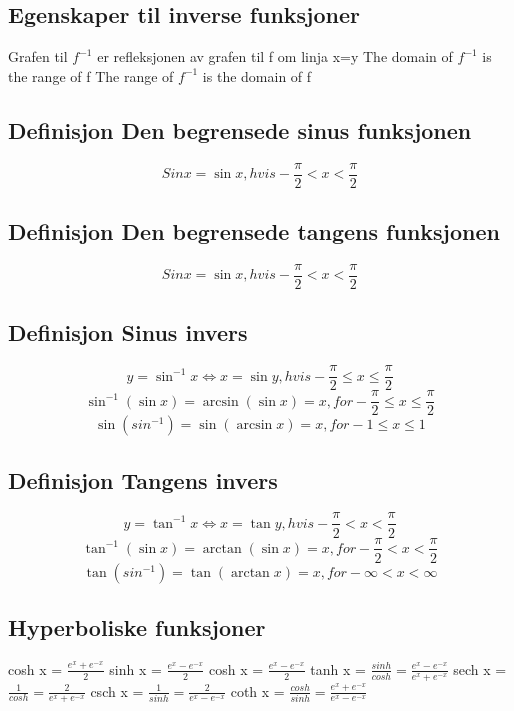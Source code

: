 \documentclass[12pt]{article}
\begin{document}
\subsection*{Egenskaper til inverse funksjoner}
Grafen til $f^{-1}$ er refleksjonen av grafen til f om linja x=y
\newline The domain of $f^{-1}$ is the range of f
\newline The range of $f^{-1}$ is the domain of f
\subsection*{Definisjon Den begrensede sinus funksjonen}
\[Sin x=\sin x,hvis -\frac{\pi}{2}<x<\frac{\pi}{2}\]
\subsection*{Definisjon Den begrensede tangens funksjonen}
\[Sin x=\sin x,hvis -\frac{\pi}{2}<x<\frac{\pi}{2}\]
\subsection*{Definisjon Sinus invers}
\[y=\sin^{-1}x\Leftrightarrow x=\sin y,hvis -\frac{\pi}{2}\leq x\leq\frac{\pi}{2}\]
\[\sin^{-1}(\sin x)=\arcsin(\sin x)=x,for-\frac{\pi}{2}\leq x\leq\frac{\pi}{2}\]
\[\sin(sin^{-1})=\sin(\arcsin x)=x,for-1\leq x\leq1\]
\subsection*{Definisjon Tangens invers}
\[y=\tan^{-1}x\Leftrightarrow x=\tan y,hvis -\frac{\pi}{2}<x<\frac{\pi}{2}\]
\[\tan^{-1}(\sin x)=\arctan(\sin x)=x,for-\frac{\pi}{2}<x<\frac{\pi}{2}\]
\[\tan(sin^{-1})=\tan(\arctan x)=x,for-\infty<x<\infty\]
\subsection*{Hyperboliske funksjoner}
cosh x = $\frac{e^x + e^{-x}}{2}$
\newline sinh x = $\frac{e^x - e^{-x}}{2}$
\newline cosh x = $\frac{e^x - e^{-x}}{2}$
\newline tanh x = $\frac{sinh}{cosh}=\frac{e^x - e^{-x}}{e^x + e^{-x}}$
\newline sech x = $\frac{1}{cosh}=\frac{2}{e^x + e^{-x}}$
\newline csch x = $\frac{1}{sinh}=\frac{2}{e^x - e^{-x}}$
\newline coth x = $\frac{cosh}{sinh}=\frac{e^x + e^{-x}}{e^x - e^{-x}}$
\end{document}
